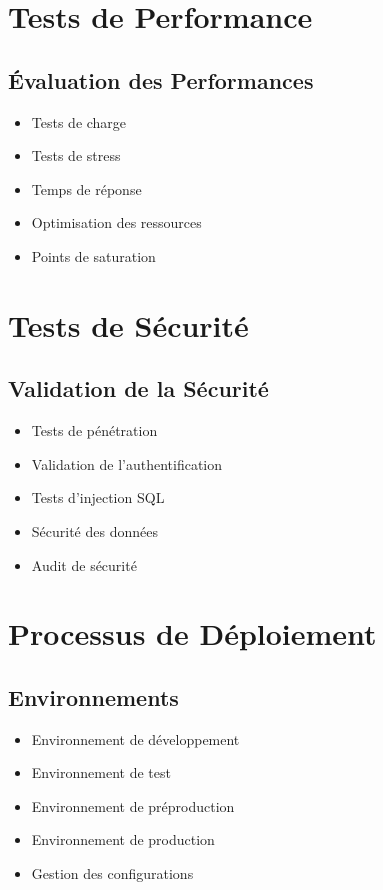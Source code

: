 \section{Tests de Performance}
\subsection{Évaluation des Performances}
\begin{itemize}
    \item Tests de charge
    \item Tests de stress
    \item Temps de réponse
    \item Optimisation des ressources
    \item Points de saturation
\end{itemize}

\section{Tests de Sécurité}
\subsection{Validation de la Sécurité}
\begin{itemize}
    \item Tests de pénétration
    \item Validation de l'authentification
    \item Tests d'injection SQL
    \item Sécurité des données
    \item Audit de sécurité
\end{itemize}

\section{Processus de Déploiement}
\subsection{Environnements}
\begin{itemize}
    \item Environnement de développement
    \item Environnement de test
    \item Environnement de préproduction
    \item Environnement de production
    \item Gestion des configurations
\end{itemize}

